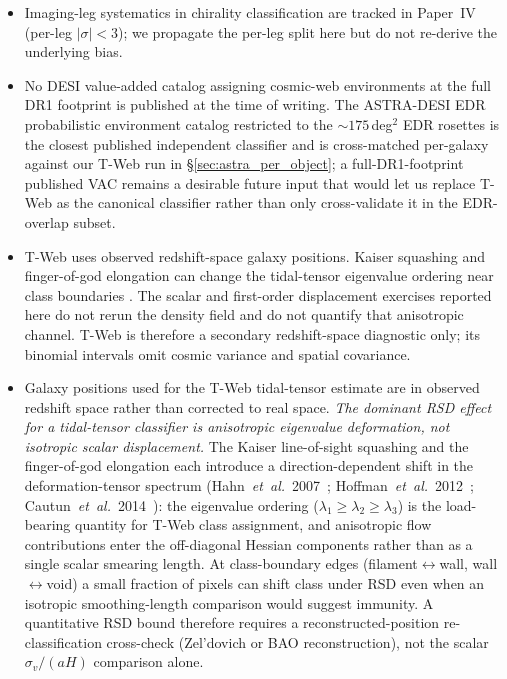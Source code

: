 \documentclass[aps,prd,twocolumn,superscriptaddress,showpacs,preprintnumbers,nofootinbib,longbibliography,floatfix]{revtex4-2}
\begin{document}
\begin{itemize}
against the final published Paper~IV catalog, whose arXiv identifier is
inserted here on posting.
\item Imaging-leg systematics in chirality classification are tracked
in Paper~IV (per-leg $|\sigma|\!<\!3$); we propagate the per-leg split
here but do not re-derive the underlying bias.
\item No DESI value-added catalog assigning cosmic-web environments
at the full DR1 footprint is published at the time of writing.
The ASTRA-DESI EDR probabilistic environment catalog
\cite{ASTRADESI2026} restricted to the $\sim\!175$\,deg$^2$ EDR
rosettes is the closest published independent classifier and is
cross-matched per-galaxy against our T-Web run in
\S\ref{sec:astra_per_object}; a full-DR1-footprint published VAC
remains a desirable future input that would let us replace T-Web as
the canonical classifier rather than only cross-validate it in
the EDR-overlap subset.
\item T-Web uses observed redshift-space galaxy positions. Kaiser
squashing and finger-of-god elongation can change the tidal-tensor
eigenvalue ordering near class boundaries
\cite{Hahn2007,Hoffman2012,Cautun2014}. The scalar and first-order
displacement exercises reported here do not rerun the density field and
do not quantify that anisotropic channel. T-Web is therefore a secondary
redshift-space diagnostic only; its binomial intervals omit cosmic
variance and spatial covariance.
\iffalse
\item Galaxy positions used for the T-Web tidal-tensor estimate are
in observed redshift space rather than corrected to real space.
\emph{The dominant RSD effect for a tidal-tensor classifier is
anisotropic eigenvalue deformation, not isotropic scalar displacement.}
The Kaiser
line-of-sight squashing and the finger-of-god elongation each
introduce a direction-dependent shift in the deformation-tensor
spectrum
(Hahn~\textit{et~al.}~2007~\cite{Hahn2007};
Hoffman~\textit{et~al.}~2012~\cite{Hoffman2012};
Cautun~\textit{et~al.}~2014~\cite{Cautun2014}): the eigenvalue
ordering ($\lambda_1 \ge \lambda_2 \ge \lambda_3$) is the
load-bearing quantity for T-Web class assignment, and anisotropic
flow contributions enter the off-diagonal Hessian components rather
than as a single scalar smearing length. At class-boundary edges
(filament$\leftrightarrow$wall, wall$\leftrightarrow$void) a small
fraction of pixels can shift class under RSD even when an isotropic
smoothing-length comparison would suggest immunity. A quantitative
RSD bound therefore requires a reconstructed-position re-classification
cross-check (Zel'dovich or BAO reconstruction), not the scalar
$\sigma_v/(aH)$ comparison alone.


\end{itemize}
\end{document}
